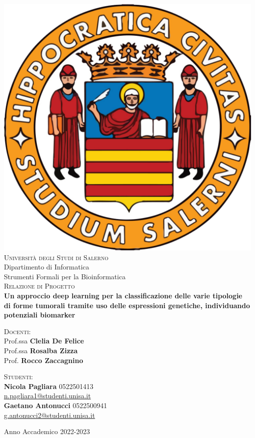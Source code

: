 \documentclass[a4paper, 10pt, titlepage]{article}
\begin{document}
    \begin{titlepage}
        \begin{center}
            \includegraphics [width=.15\columnwidth, angle=0]{unisa}\\ %
            \vspace{0.5cm}
            {\LARGE \scshape Università degli Studi di Salerno}\\
            \vspace{0.5cm}
            {\Large Dipartimento di Informatica}\\
            \vspace{0.1cm}
            {\large Strumenti Formali per la Bioinformatica}\\
            \vspace{1.5cm}
            {\Large \scshape Relazione di Progetto} \\
            \vspace{4cm}
            {\huge \bfseries Un approccio deep learning per la classificazione delle varie tipologie di forme tumorali tramite uso delle espressioni genetiche, individuando potenziali biomarker} \\ 
            \vspace{2cm}
        \end{center}   
        \begin{minipage}[t]{6cm}
        \flushleft
        \textsc{Docenti:}\\
        Prof.ssa \textbf{Clelia De Felice} \\
        Prof.ssa \textbf{Rosalba Zizza} \\
        Prof. \textbf{Rocco Zaccagnino} \\
        \end{minipage}
        \hfill
        \begin{minipage}[t]{6cm}
        \flushright
        \textsc{Studenti:}\\
        \textbf{Nicola Pagliara} 0522501413 \\
        {\small \url{n.pagliara1@studenti.unisa.it}} \\
        \textbf{Gaetano Antonucci} 0522500941\\
        {\small \url{g.antonucci2@studenti.unisa.it}} \\
        \end{minipage}
        \vspace{3cm}
        \begin{center}
            {\small Anno Accademico 2022-2023} 
        \end{center}   
    \end{titlepage}
\end{document}
